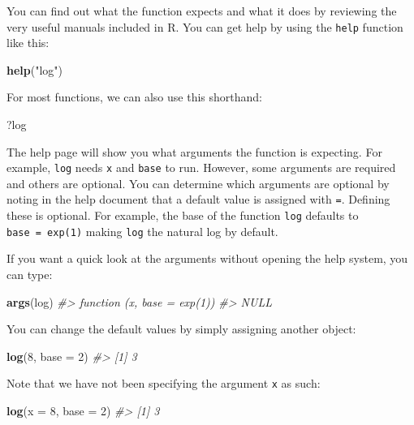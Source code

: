 \documentclass[
]{krantz}
\newenvironment{Shaded}{\begin{snugshade}}{\end{snugshade}}
\newcommand{\CommentTok}[1]{\textcolor[rgb]{0.37,0.37,0.37}{\textit{#1}}}
\newcommand{\DataTypeTok}[1]{\textcolor[rgb]{0.27,0.27,0.27}{#1}}
\newcommand{\DecValTok}[1]{\textcolor[rgb]{0.06,0.06,0.06}{#1}}
\newcommand{\KeywordTok}[1]{\textcolor[rgb]{0.27,0.27,0.27}{\textbf{#1}}}
\newcommand{\NormalTok}[1]{#1}
\newcommand{\StringTok}[1]{\textcolor[rgb]{0.5,0.5,0.5}{#1}}
\begin{document}
You can find out what the function expects and what it does by reviewing the very useful manuals included in R. You can get help by using the \texttt{help} function like this:

\begin{Shaded}
\begin{Highlighting}[]
\KeywordTok{help}\NormalTok{(}\StringTok{"log"}\NormalTok{)}
\end{Highlighting}
\end{Shaded}

For most functions, we can also use this shorthand:

\begin{Shaded}
\begin{Highlighting}[]
\NormalTok{?log}
\end{Highlighting}
\end{Shaded}

The help page will show you what arguments the function is expecting. For example, \texttt{log} needs \texttt{x} and \texttt{base} to run. However, some arguments are required and others are optional. You can determine which arguments are optional by noting in the help document that a default value is assigned with \texttt{=}. Defining these is optional. For example, the base of the function \texttt{log} defaults to \texttt{base\ =\ exp(1)} making \texttt{log} the natural log by default.

If you want a quick look at the arguments without opening the help system, you can type:

\begin{Shaded}
\begin{Highlighting}[]
\KeywordTok{args}\NormalTok{(log)}
\CommentTok{#> function (x, base = exp(1)) }
\CommentTok{#> NULL}
\end{Highlighting}
\end{Shaded}

You can change the default values by simply assigning another object:

\begin{Shaded}
\begin{Highlighting}[]
\KeywordTok{log}\NormalTok{(}\DecValTok{8}\NormalTok{, }\DataTypeTok{base =} \DecValTok{2}\NormalTok{)}
\CommentTok{#> [1] 3}
\end{Highlighting}
\end{Shaded}

Note that we have not been specifying the argument \texttt{x} as such:

\begin{Shaded}
\begin{Highlighting}[]
\KeywordTok{log}\NormalTok{(}\DataTypeTok{x =} \DecValTok{8}\NormalTok{, }\DataTypeTok{base =} \DecValTok{2}\NormalTok{)}
\CommentTok{#> [1] 3}
\end{Highlighting}
\end{Shaded}
\end{document}
